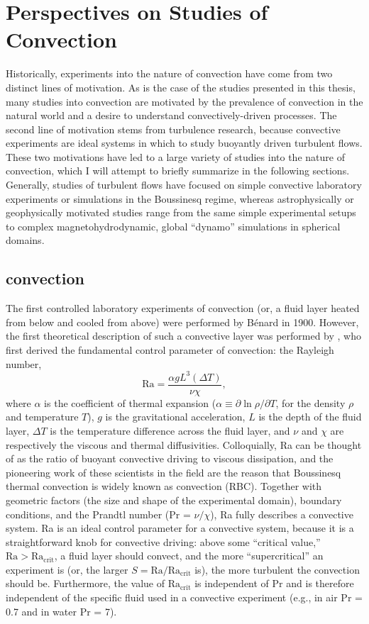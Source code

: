 \section{Perspectives on Studies of Convection}
Historically, experiments into the nature of convection have come from two distinct lines of motivation.
As is the case of the studies presented in this thesis, many studies into convection are motivated by the prevalence of convection in the natural world and a desire to understand convectively-driven processes.
The second line of motivation stems from turbulence research, because convective experiments are ideal systems in which to study buoyantly driven turbulent flows.
These two motivations have led to a large variety of studies into the nature of convection, which I will attempt to briefly summarize in the following sections.
Generally, studies of turbulent flows have focused on simple convective laboratory experiments or simulations in the Boussinesq regime, whereas astrophysically or geophysically motivated studies range from the same simple experimental setups to complex magnetohydrodynamic, global ``dynamo'' simulations in spherical domains.

\subsection{\RB convection}
The first controlled laboratory experiments of convection (or, a fluid layer heated from below and cooled from above) were performed by B\'{e}nard in 1900.
However, the first theoretical description of such a convective layer was performed by \citet{rayleigh1916}, who first derived the fundamental control parameter of convection: the Rayleigh number,
\begin{equation}
\text{Ra} = \frac{\alpha g L^3 (\Delta T)}{\nu \chi},
\label{eqn:rayleigh_number}
\end{equation}
where $\alpha$ is the coefficient of thermal expansion ($\alpha \equiv \partial \ln \rho / \partial T$, for the density $\rho$ and temperature $T$), $g$ is the gravitational acceleration, $L$ is the depth of the fluid layer, $\Delta T$ is the temperature difference across the fluid layer, and $\nu$ and $\chi$ are respectively the viscous and thermal diffusivities.
Colloquially, Ra can be thought of as the ratio of buoyant convective driving to viscous dissipation, and the pioneering work of these scientists in the field are the reason that Boussinesq thermal convection is widely known as \RB convection (RBC).
Together with geometric factors (the size and shape of the experimental domain), boundary conditions, and the Prandtl number (Pr = $\nu/\chi$), Ra fully describes a convective system.
Ra is an ideal control parameter for a convective system, because it is a straightforward knob for convective driving: above some ``critical value,'' $\text{Ra} > \text{Ra}_{\text{crit}}$, a fluid layer should convect, and the more ``supercritical'' an experiment is (or, the larger $S = \text{Ra}/\text{Ra}_{\text{crit}}$ is), the more turbulent the convection should be.
Furthermore, the value of $\text{Ra}_{\text{crit}}$ is independent of $\text{Pr}$ and is therefore independent of the specific fluid used in a convective experiment (e.g., in air Pr = 0.7 and in water Pr = 7).

